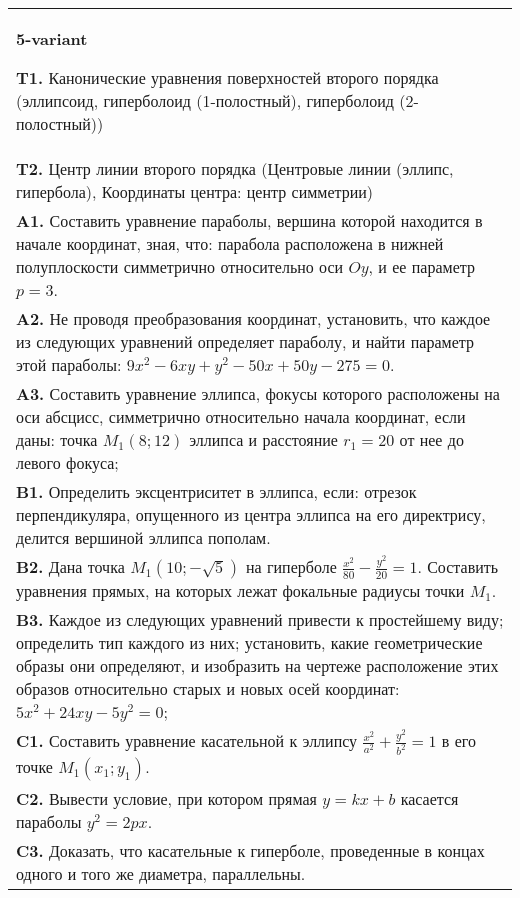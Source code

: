 \documentclass{article}
\begin{document}
\begin{tabular}{m{17cm}}
\textbf{5-variant}
\newline

\textbf{T1.} Канонические уравнения поверхностей второго порядка (эллипсоид, гиперболоид (1-полостный), гиперболоид (2-полостный)) \\
\textbf{T2.} Центр линии второго порядка (Центровые линии (эллипс, гипербола), Координаты центра: центр симметрии) \\
\textbf{A1.} Составить уравнение параболы, вершина которой находится в начале координат, зная, что: парабола расположена в нижней полуплоскости симметрично относительно оси $O y$, и ее параметр $p=3$. \\
\textbf{A2.} Не проводя преобразования координат, установить, что каждое из следующих уравнений определяет параболу, и найти параметр этой параболы: $9 x^2-6 x y+y^2-50 x+50 y-275=0$. \\
\textbf{A3.} Составить уравнение эллипса, фокусы которого расположены на оси абсцисс, симметрично относительно начала координат, если даны: точка $M_1(8 ; 12)$ эллипса и расстояние $r_1=20$ от нее до левого фокуса; \\
\textbf{B1.} Определить эксцентриситет в эллипса, если: отрезок перпендикуляра, опущенного из центра эллипса на его директрису, делится вершиной эллипса пополам. \\
\textbf{B2.} Дана точка $M_1(10 ;-\sqrt{5})$ на гиперболе $\frac{x^2}{80}-\frac{y^2}{20}=1$. Составить уравнения прямых, на которых лежат фокальные радиусы точки $M_1$. \\
\textbf{B3.} Каждое из следующих уравнений привести к простейшему виду; определить тип каждого из них; установить, какие геометрические образы они определяют, и изобразить на чертеже расположение этих образов относительно старых и новых осей координат: $5 x^2+24 x y-5 y^2=0$; \\
\textbf{C1.} Составить уравнение касательной к эллипсу $\frac{x^2}{a^2}+\frac{y^2}{b^2}=1$ в его точке $M_1\left(x_1 ; y_1\right)$. \\
\textbf{C2.} Вывести условие, при котором прямая $y=k x+b$ касается параболы $y^2=2 p x$. \\
\textbf{C3.} Доказать, что касательные к гиперболе, проведенные в концах одного и того же диаметра, параллельны. \\

\end{tabular}
\vspace{1cm}
\end{document}
